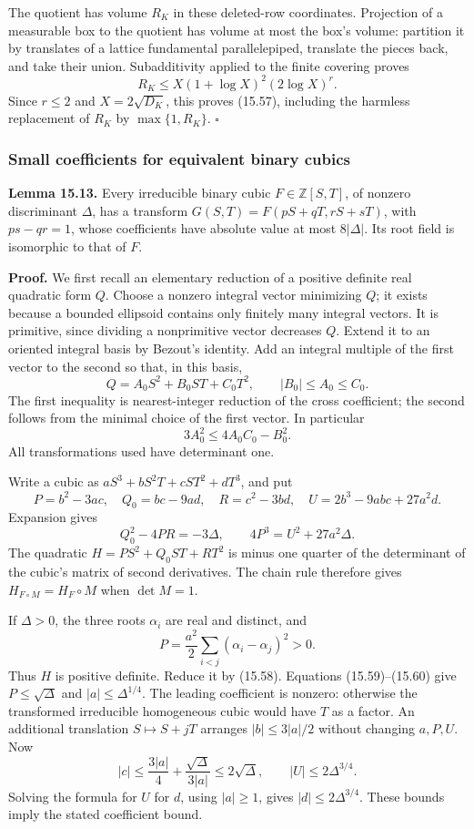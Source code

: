 \documentclass[
  11pt,
  a4paper,
]{article}
\begin{document}
The quotient has volume \(R_K\) in these deleted-row coordinates.
Projection of a measurable box to the quotient has volume at most the
box's volume: partition it by translates of a lattice fundamental
parallelepiped, translate the pieces back, and take their union.
Subadditivity applied to the finite covering proves \[
R_K\le X(1+\log X)^2(2\log X)^r.
\] Since \(r\le2\) and \(X=2\sqrt{D_K}\), this proves (15.57), including
the harmless replacement of \(R_K\) by \(\max\{1,R_K\}\). \(\square\)

\subsubsection{Small coefficients for equivalent binary
cubics}\label{small-coefficients-for-equivalent-binary-cubics}

\textbf{Lemma 15.13.} Every irreducible binary cubic
\(F\in\mathbb Z[S,T]\), of nonzero discriminant \(\Delta\), has a
transform \(G(S,T)=F(pS+qT,rS+sT)\), with \(ps-qr=1\), whose
coefficients have absolute value at most \(8|\Delta|\). Its root field
is isomorphic to that of \(F\).

\textbf{Proof.} We first recall an elementary reduction of a positive
definite real quadratic form \(Q\). Choose a nonzero integral vector
minimizing \(Q\); it exists because a bounded ellipsoid contains only
finitely many integral vectors. It is primitive, since dividing a
nonprimitive vector decreases \(Q\). Extend it to an oriented integral
basis by Bezout's identity. Add an integral multiple of the first vector
to the second so that, in this basis, \[
Q=A_0 S^2+B_0 ST+C_0T^2,\qquad |B_0|\le A_0\le C_0.
\tag{15.58}
\] The first inequality is nearest-integer reduction of the cross
coefficient; the second follows from the minimal choice of the first
vector. In particular \[
3A_0^2\le 4A_0C_0-B_0^2.
\tag{15.59}
\] All transformations used have determinant one.

Write a cubic as \(aS^3+bS^2T+cST^2+dT^3\), and put \[
P=b^2-3ac,\quad Q_0=bc-9ad,\quad R=c^2-3bd,\quad
U=2b^3-9abc+27a^2d.
\] Expansion gives \[
Q_0^2-4PR=-3\Delta,\qquad
4P^3=U^2+27a^2\Delta.
\tag{15.60}
\] The quadratic \(H=PS^2+Q_0ST+RT^2\) is minus one quarter of the
determinant of the cubic's matrix of second derivatives. The chain rule
therefore gives \(H_{F\circ M}=H_F\circ M\) when \(\det M=1\).

If \(\Delta>0\), the three roots \(\alpha_i\) are real and distinct, and
\[
P=\frac{a^2}{2}\sum_{i<j}(\alpha_i-\alpha_j)^2>0.
\] Thus \(H\) is positive definite. Reduce it by (15.58). Equations
(15.59)--(15.60) give \(P\le\sqrt\Delta\) and \(|a|\le\Delta^{1/4}\).
The leading coefficient is nonzero: otherwise the transformed
irreducible homogeneous cubic would have \(T\) as a factor. An
additional translation \(S\mapsto S+jT\) arranges \(|b|\le3|a|/2\)
without changing \(a,P,U\). Now \[
|c|\le \frac{3|a|}{4}+\frac{\sqrt\Delta}{3|a|}
       \le2\sqrt\Delta,\qquad |U|\le2\Delta^{3/4}.
\] Solving the formula for \(U\) for \(d\), using \(|a|\ge1\), gives
\(|d|\le 2\Delta^{3/4}\). These bounds imply the stated coefficient
bound.
\end{document}
